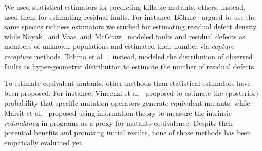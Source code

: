 \documentclass[sigconf,review,anonymous]{acmart}
\newcounter{todocounter}
\newcommand{\todo}[1]{\marginpar{$|$}\textcolor{red}{\stepcounter{todocounter}\footnote[\thetodocounter]{\textcolor{red}{\textbf{TODO }}\textit{#1}}}}
\renewcommand{\todo}[1]{}
\begin{document}
We used statistical estimators for predicting killable mutants, others, instead, used
them for estimating residual faults.
%
For instance, B{\"o}hme~\cite{bohme2018stads} argued to use the same
species richness estimators we studied for estimating residual defect density,
while Nayak~\cite{nayak1988estimating} and Voas~and~McGraw~\cite{voas1997software}
modeled faults and 
residual defects as members of unknown populations
and estimated their number via \emph{capture-recapture} methods.
%
%
%
%
Tohma et al.~\cite{tohma1989structural}, instead, modeled
the distribution of observed faults as hyper-geometric distribution
to estimate the number of residual defects.

To estimate equivalent mutants, other methods 
than statistical estimators have been proposed.
%
For instance, Vincenzi et al.~\cite{vincenzi2002bayesian} proposed to 
estimate the (posterior) probability that specific mutation operators
generate equivalent mutants, while
%
Marsit et al.~\cite{marsit2017estimating,marsit2018impact,ayad2019estimating}
proposed using information theory %
to measure the intrinsic \emph{redundancy} in programs as a proxy for mutants equivalence. 
Despite their potential benefits and promising initial results,
none of those methods has been empirically evaluated yet.

\end{document}
